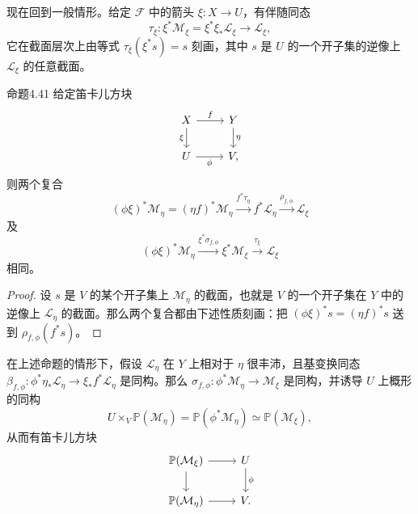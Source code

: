 现在回到一般情形。给定 $\mathcal F$ 中的箭头 $\xi\colon X\to U$，有伴随同态
\[
 \tau_\xi\colon\xi^*\mathcal M_\xi=\xi^*\xi_*\mathcal L_\xi\longrightarrow\mathcal L_\xi,
\]
它在截面层次上由等式 $\tau_\xi(\xi^*s)=s$ 刻画，其中 $s$ 是 $U$ 的一个开子集的逆像上 $\mathcal L_\xi$ 的任意截面。

\begin{origstatement}{命题}{4.41}\label{ch04:prop441}
给定笛卡儿方块
\[
\begin{tikzcd}
 X\arrow[r,"{f}"]\arrow[d,"{\xi}"']&Y\arrow[d,"{\eta}"]\\
 U\arrow[r,"{\phi}"']&V,
\end{tikzcd}
\]
则两个复合
\[
 (\phi\xi)^*\mathcal M_\eta=(\eta f)^*\mathcal M_\eta
 \xrightarrow{f^*\tau_\eta}f^*\mathcal L_\eta\xrightarrow{\rho_{f,\phi}}\mathcal L_\xi
\]
及
\[
 (\phi\xi)^*\mathcal M_\eta\xrightarrow{\xi^*\sigma_{f,\phi}}
 \xi^*\mathcal M_\xi\xrightarrow{\tau_\xi}\mathcal L_\xi
\]
相同。
\end{origstatement}
\begin{proof}
设 $s$ 是 $V$ 的某个开子集上 $\mathcal M_\eta$ 的截面，也就是 $V$ 的一个开子集在 $Y$ 中的逆像上 $\mathcal L_\eta$ 的截面。那么两个复合都由下述性质刻画：把 $(\phi\xi)^*s=(\eta f)^*s$ 送到 $\rho_{f,\phi}(f^*s)$。
\end{proof}

在上述命题的情形下，假设 $\mathcal L_\eta$ 在 $Y$ 上相对于 $\eta$ 很丰沛，且基变换同态 $\beta_{f,\phi}\colon\phi^*\eta_*\mathcal L_\eta\to\xi_*f^*\mathcal L_\eta$ 是同构。那么 $\sigma_{f,\phi}\colon\phi^*\mathcal M_\eta\to\mathcal M_\xi$ 是同构，并诱导 $U$ 上概形的同构
\[
 U\times_V\mathbb P(\mathcal M_\eta)=\mathbb P(\phi^*\mathcal M_\eta)\simeq\mathbb P(\mathcal M_\xi),
\]
从而有笛卡儿方块
\[
\begin{tikzcd}
 \mathbb P(\mathcal M_\xi)\arrow[r]\arrow[d]&U\arrow[d,"{\phi}"]\\
 \mathbb P(\mathcal M_\eta)\arrow[r]&V.
\end{tikzcd}
\]

